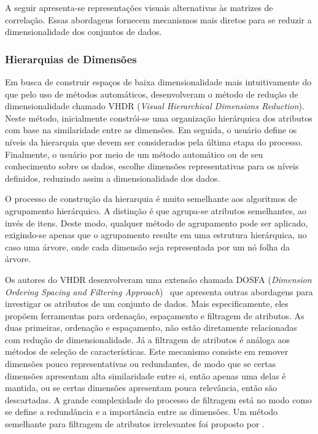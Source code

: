 A seguir apresenta-se representações visuais alternativas às
matrizes de correlação. Essas abordagens fornecem mecanismos
mais diretos para se reduzir a dimensionalidade dos
conjuntos de dados. 

\subsubsection{Hierarquias de Dimensões}

Em busca de construir espaços de baixa dimensionalidade mais
intuitivamente do que pelo uso de métodos automáticos,
\citet{Yang2003} desenvolveram o método de redução de
dimensionalidade chamado VHDR (\emph{Visual Hierarchical
Dimensions Reduction}). Neste método, inicialmente
constrói-se uma organização hierárquica dos atributos com
base na similaridade entre as dimensões. Em seguida, o
usuário define os níveis da hierarquia que devem ser
considerados pela última etapa do processo. Finalmente, o
usuário por meio de um método automático ou de seu
conhecimento sobre os dados, escolhe dimensões
representativas para os níveis definidos, reduzindo assim a
dimensionalidade dos dados. 

O processo de construção da hierarquia é muito semelhante
aos algoritmos de agrupamento hierárquico. A distinção é que
agrupa-se atributos semelhantes, ao invés de itens. Deste
modo, qualquer método de agrupamento pode ser aplicado,
exigindo-se apenas que o agrupamento resulte em uma
estrutura hierárquica, no caso uma árvore, onde cada
dimensão seja representada por um nó folha da árvore. 

Os autores do VHDR desenvolveram uma extensão chamada DOSFA
(\emph{Dimension Ordering Spacing and Filtering
Approach})~\cite{DOSFA} que apresenta outras abordagens para
investigar os atributos de um conjunto de dados. Mais
especificamente, eles propõem ferramentas para ordenação,
espaçamento e filtragem de atributos. As duas primeiras,
ordenação e espaçamento, não estão diretamente relacionadas
com redução de dimensionalidade. Já a filtragem de atributos
é análoga aos métodos de seleção de características. Este
mecanismo consiste em remover dimensões pouco
representativas ou redundantes, de modo que se certas
dimensões apresentam alta similaridade entre si, então
apenas uma delas é mantida, ou se certas dimensões
apresentam pouca relevância, então são descartadas. A grande
complexidade do processo de filtragem está no modo como se
define a redundância e a importância entre as dimensões. Um
método semelhante para filtragem de atributos irrelevantes
foi proposto por \citet{Artero2006}.

